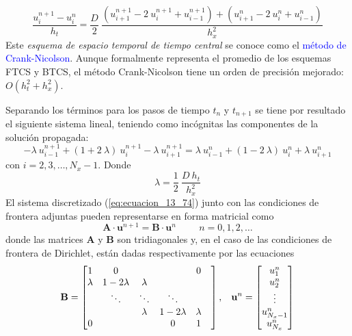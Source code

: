 \begin{equation}
\dfrac{u_{i}^{n+1} - u_{i}^{n}}{h_{t}} = \dfrac{D}{2} \: \dfrac{( u_{i+1}^{n+1} - 2 \: u_{i}^{n+1} + u_{i-1}^{n+1}) + (u_{i+1}^{n} - 2 \: u_{i}^{n} + u_{i-1}^{n})}{h_{x}^{2}}
\label{eq:ecuacion_13_73}
\end{equation}
Este \emph{esquema de espacio temporal de tiempo central} se conoce como el \textcolor{blue}{método de Crank-Nicolson}. Aunque formalmente representa el promedio de los esquemas FTCS y BTCS, el método Crank-Nicolson tiene un orden de precisión mejorado: $O (h_{t}^{2} + h_{x}^{2})$.
\par
Separando los términos para los pasos de tiempo $t_{n}$ y $t_{n+1}$ se tiene por resultado el siguiente sistema lineal, teniendo como incógnitas las componentes de la solución propagada:
\begin{equation}
- \lambda \: u_{i-1}^{n+1} + (1 + 2 \: \lambda) \: u_{i}^{n+1} - \lambda \: u_{i+1}^{n+1} = \lambda \: u_{i-1}^{n} +(1 - 2 \: \lambda) \: u_{i}^{n} + \lambda \: u_{i+1}^{n}
\label{eq:ecuacion_13_74}
\end{equation}
con $i = 2, 3, \ldots, N_{x}-1$. Donde
\begin{equation}
\lambda = \dfrac{1}{2} \: \dfrac{D \: h_{t}}{h_{x}^{2}}
\label{eq:ecuacion_13_75}
\end{equation}
El sistema discretizado (\ref{eq:ecuacion_13_74}) junto con las condiciones de frontera adjuntas pueden representarse en forma matricial como
\begin{equation}
\mathbf{A} \cdot \mathbf{u}^{n+1} = \mathbf{B} \cdot \mathbf{u}^{n} \hspace{1cm} n = 0, 1, 2, \ldots
\label{eq:ecuacion_13_76}
\end{equation}
donde las matrices $\mathbf{A}$ y $\mathbf{B}$ son tridiagonales y, en el caso de las condiciones de frontera de Dirichlet, están dadas respectivamente por las ecuaciones
\begin{equation}
\mathbf{B} = \begin{bmatrix}
1 & 0 & & & 0 \\
\lambda & 1 - 2 \lambda & \lambda & & & \\
 & \ddots & \ddots & \ddots & \\
 & & \lambda & 1 - 2 \lambda & \lambda \\
 0 & & & 0 & 1
\end{bmatrix},
\hspace{0.3cm}
\mathbf{u}^{n} = 
\begin{bmatrix}
u_{1}^{n} \\
u_{2}^{n} \\
\vdots \\
u_{N_{x} - 1}^{n} \\
u_{N_{x}}^{n} 
\end{bmatrix}
\label{eq:ecuacion_13_50}
\end{equation}
